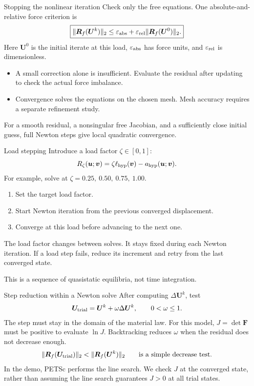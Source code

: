 \documentclass[11pt,aspectratio=169]{beamer}
\newcommand{\bu}{\bm u}
\newcommand{\bv}{\bm v}
\newcommand{\bF}{\bm F}
\newcommand{\bU}{\bm U}
\newcommand{\bR}{\bm R}
\begin{document}
\begin{frame}{Stopping the nonlinear iteration}
Check only the free equations. One absolute-and-relative force criterion is
\[
\boxed{\|\bR_f(\bU^k)\|_2
\leq\varepsilon_{\rm abs}
+\varepsilon_{\rm rel}\|\bR_f(\bU^0)\|_2.}
\]
Here $\bU^0$ is the initial iterate at this load,
$\varepsilon_{\rm abs}$ has force units, and $\varepsilon_{\rm rel}$ is
dimensionless.
\begin{itemize}
\item A small correction alone is insufficient. Evaluate the residual after
updating to check the actual force imbalance.
\item Convergence solves the equations on the chosen mesh. Mesh accuracy
requires a separate refinement study.
\end{itemize}
For a smooth residual, a nonsingular free Jacobian, and a sufficiently close
initial guess, full Newton steps give local quadratic convergence.
\end{frame}

\begin{frame}{Load stepping}
Introduce a load factor $\zeta\in[0,1]$:
\[
R_\zeta(\bu;\bv)
=\zeta\ell_{\rm hyp}(\bv)-a_{\rm hyp}(\bu;\bv).
\]
For example, solve at $\zeta=0.25,\ 0.50,\ 0.75,\ 1.00$.
\begin{enumerate}
\item Set the target load factor.
\item Start Newton iteration from the previous converged displacement.
\item Converge at this load before advancing to the next one.
\end{enumerate}
The load factor changes between solves. It stays fixed during each Newton
iteration. If a load step fails, reduce its increment and retry from the last
converged state.

This is a sequence of quasistatic equilibria, not time integration.
\end{frame}

\begin{frame}{Step reduction within a Newton solve}
After computing $\Delta\bU^k$, test
\[
\bU_{\rm trial}=\bU^k+\omega\Delta\bU^k,
\qquad 0<\omega\leq1.
\]
The step must stay in the domain of the material law. For this model,
$J=\det\bF$ must be positive to evaluate $\ln J$.
Backtracking reduces $\omega$ when the residual does not decrease enough.
\[
\|\bR_f(\bU_{\rm trial})\|_2<\|\bR_f(\bU^k)\|_2
\qquad\text{is a simple decrease test.}
\]
In the demo, PETSc performs the line search. We check $J$ at the
converged state, rather than assuming the line search guarantees $J>0$
at all trial states.
\end{frame}
\end{document}
